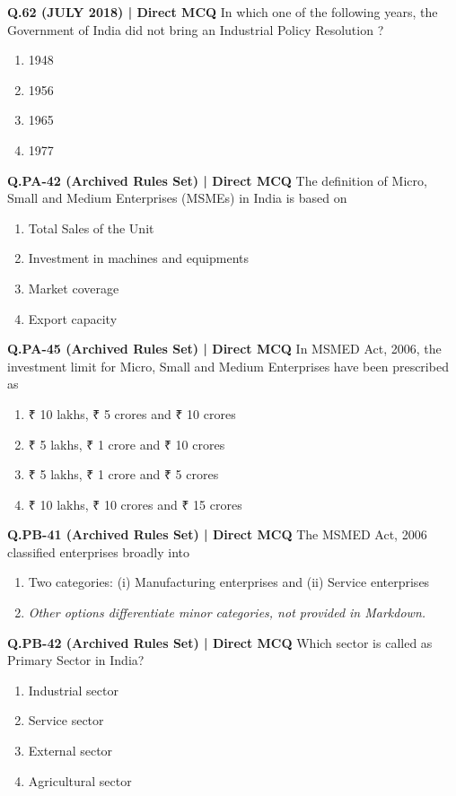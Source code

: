 \documentclass{article}
\begin{document}
\textbf{Q.62 (JULY 2018) | Direct MCQ}
In which one of the following years, the Government of India did not bring an Industrial Policy Resolution ?
\begin{enumerate}[label=(\arabic*)]
    \item 1948
    \item 1956
    \item 1965
    \item 1977
\end{enumerate}

\textbf{Q.PA-42 (Archived Rules Set) | Direct MCQ}
The definition of Micro, Small and Medium Enterprises (MSMEs) in India is based on
\begin{enumerate}[label=(\arabic*)]
    \item Total Sales of the Unit
    \item Investment in machines and equipments
    \item Market coverage
    \item Export capacity
\end{enumerate}

\textbf{Q.PA-45 (Archived Rules Set) | Direct MCQ}
In MSMED Act, 2006, the investment limit for Micro, Small and Medium Enterprises have been prescribed as
\begin{enumerate}[label=(\arabic*)]
    \item ₹ 10 lakhs, ₹ 5 crores and ₹ 10 crores
    \item ₹ 5 lakhs, ₹ 1 crore and ₹ 10 crores
    \item ₹ 5 lakhs, ₹ 1 crore and ₹ 5 crores
    \item ₹ 10 lakhs, ₹ 10 crores and ₹ 15 crores
\end{enumerate}

\textbf{Q.PB-41 (Archived Rules Set) | Direct MCQ}
The MSMED Act, 2006 classified enterprises broadly into
\begin{enumerate}[label=(\arabic*)]
    \item Two categories: (i) Manufacturing enterprises and (ii) Service enterprises
    \item \emph{Other options differentiate minor categories, not provided in Markdown.}
\end{enumerate}

\textbf{Q.PB-42 (Archived Rules Set) | Direct MCQ}
Which sector is called as Primary Sector in India?
\begin{enumerate}[label=(\arabic*)]
    \item Industrial sector
    \item Service sector
    \item External sector
    \item Agricultural sector
\end{enumerate}
\end{document}
